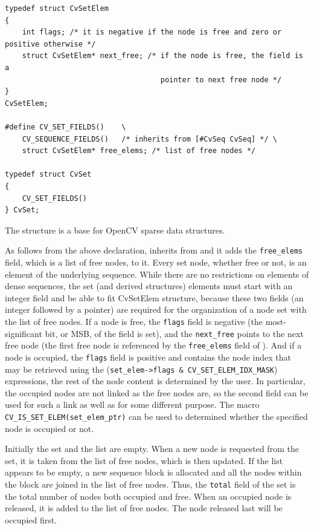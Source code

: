 \fi

\ifC
\begin{lstlisting}
typedef struct CvSetElem
{
    int flags; /* it is negative if the node is free and zero or positive otherwise */
    struct CvSetElem* next_free; /* if the node is free, the field is a
                                    pointer to next free node */
}
CvSetElem;

#define CV_SET_FIELDS()    \
    CV_SEQUENCE_FIELDS()   /* inherits from [#CvSeq CvSeq] */ \
    struct CvSetElem* free_elems; /* list of free nodes */

typedef struct CvSet
{
    CV_SET_FIELDS()
} CvSet;
\end{lstlisting}

The structure  is a base for OpenCV sparse data structures.

As follows from the above declaration, \cross{CvSet} inherits from
 and it adds the \texttt{free\_elems} field, which
is a list of free nodes, to it. Every set node, whether free or not, is an
element of the underlying sequence. While there are no restrictions on
elements of dense sequences, the set (and derived structures) elements
must start with an integer field and be able to fit CvSetElem structure,
because these two fields (an integer followed by a pointer) are required
for the organization of a node set with the list of free nodes. If a node is
free, the \texttt{flags} field is negative (the most-significant bit, or
MSB, of the field is set), and the \texttt{next\_free} points to the next
free node (the first free node is referenced by the \texttt{free\_elems}
field of \cross{CvSet}). And if a node is occupied, the \texttt{flags} field
is positive and contains the node index that may be retrieved using the
(\texttt{set\_elem->flags \& CV\_SET\_ELEM\_IDX\_MASK}) expressions, the rest of
the node content is determined by the user. In particular, the occupied
nodes are not linked as the free nodes are, so the second field can be
used for such a link as well as for some different purpose. The macro
\texttt{CV\_IS\_SET\_ELEM(set\_elem\_ptr)} can be used to determined whether
the specified node is occupied or not.

Initially the set and the list are empty. When a new node is requested
from the set, it is taken from the list of free nodes, which is then updated. If the list appears to be empty, a new sequence block is allocated
and all the nodes within the block are joined in the list of free
nodes. Thus, the \texttt{total} field of the set is the total number of nodes
both occupied and free. When an occupied node is released, it is added
to the list of free nodes. The node released last will be occupied first.


